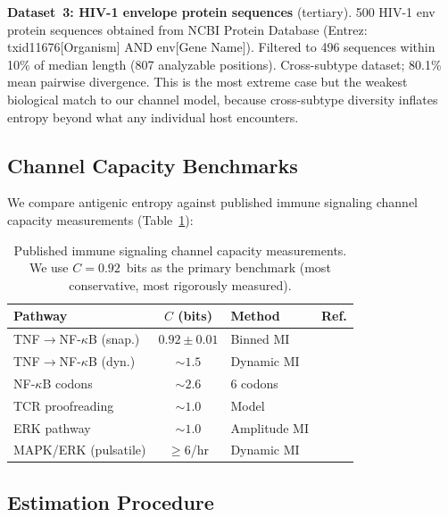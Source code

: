 \documentclass[twocolumn,10pt]{article}
\begin{document}
\textbf{Dataset~3: HIV-1 envelope protein sequences} (tertiary).  500 HIV-1 env protein sequences obtained from NCBI Protein Database (Entrez: txid11676[Organism] AND env[Gene Name]).  Filtered to 496 sequences within 10\% of median length (807 analyzable positions).  Cross-subtype dataset; 80.1\% mean pairwise divergence.  This is the most extreme case but the weakest biological match to our channel model, because cross-subtype diversity inflates entropy beyond what any individual host encounters.

\subsection{Channel Capacity Benchmarks}

We compare antigenic entropy against published immune signaling channel capacity measurements (Table~\ref{tab:benchmarks}):

\begin{table}[t]
\centering
\caption{Published immune signaling channel capacity measurements.  We use $C = 0.92$~bits as the primary benchmark (most conservative, most rigorously measured).}
\label{tab:benchmarks}
\footnotesize
\begin{tabular}{@{}lclc@{}}
\toprule
Pathway & $C$ (bits) & Method & Ref. \\
\midrule
TNF$\to$NF-$\kappa$B (snap.) & $0.92 \pm 0.01$ & Binned MI & \footnotesize{\citeyear{cheong2011}} \\
TNF$\to$NF-$\kappa$B (dyn.) & ${\sim}1.5$ & Dynamic MI & \footnotesize{\citeyear{selimkhanov2014}} \\
NF-$\kappa$B codons & ${\sim}2.6$ & 6 codons & \footnotesize{\citeyear{adelaja2021}} \\
TCR proofreading & ${\sim}1.0$ & Model & \footnotesize{\citeyear{ganti2020}} \\
ERK pathway & ${\sim}1.0$ & Amplitude MI & \footnotesize{\citeyear{uda2013}} \\
MAPK/ERK (pulsatile) & ${\geq}6$/hr & Dynamic MI & \footnotesize{\citeyear{nalecz2023}} \\
\bottomrule
\end{tabular}
\end{table}

\subsection{Estimation Procedure}
\end{document}
